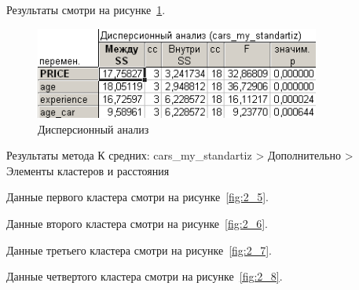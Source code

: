 Результаты смотри на рисунке~\ref{fig:2_4}.

\begin{figure}[!h]
  \centering

  \includegraphics[height=3cm]
  {inc/cars_my/2.4.PNG}

  \caption{Дисперсионный анализ}
  \label{fig:2_4}
\end{figure}

\newpage

Результаты метода К средних: cars\_my\_standartiz > Дополнительно > Элементы кластеров и расстояния

Данные первого кластера смотри на рисунке~\ref{fig:2_5}.

Данные второго кластера смотри на рисунке~\ref{fig:2_6}.

Данные третьего кластера смотри на рисунке~\ref{fig:2_7}.

Данные четвертого кластера смотри на рисунке~\ref{fig:2_8}.

